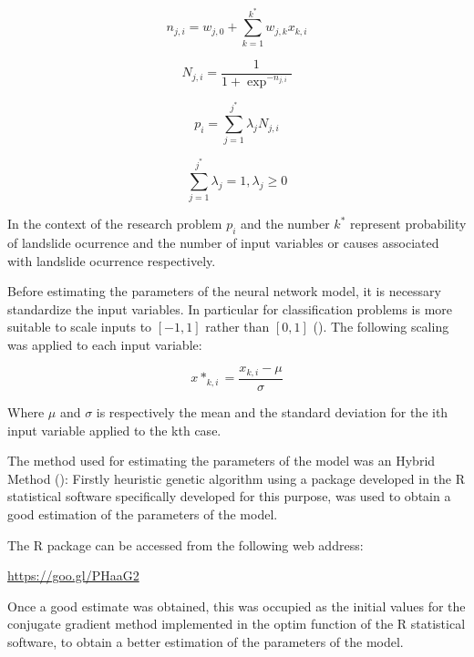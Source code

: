 \documentclass[11pt,twoside]{rmta2010esp}%
\begin{document}
\begin{equation}
n_{j,i} = w_{j,0} + \sum_{k=1}^{k^{*}} w_{j,k}x_{k,i}
\end{equation}

\begin{equation}
N_{j,i} = \frac{1}{1+\exp^{-n_{j,i}}}
\end{equation}



\begin{equation}
p_{i} = \sum_{j=1}^{j^{*}} \lambda_{j} N_{j,i}
\end{equation}

\begin{equation}
\sum_{j=1}^{j^{*}} \lambda_{j} = 1 , \lambda_{j} \ge 0
\end{equation}



In the context of the research problem $p_{i} $ and the number $ k^{*} $ represent 
probability of landslide ocurrence and the number of input variables or causes associated with landslide ocurrence respectively.

Before estimating the parameters of the neural network model, it is necessary standardize the input variables. In particular for classification problems is more suitable to scale inputs to $[-1,1]$ rather than $[0,1]$ (\cite{FAQANN}). The following scaling was applied to each input variable: 

\begin{equation}
x*_{k,i} = \frac{x_{k,i} - \mu }{\sigma}
\end{equation}

Where $ \mu $ and $\sigma$  is respectively the mean and the standard deviation for the ith input variable applied to the kth case.  

The method used for estimating the parameters of the model was an Hybrid Method (\cite{McNelis2005}): Firstly heuristic genetic algorithm using a package developed in the R statistical software specifically developed for this purpose, was used to obtain 
a good estimation of the parameters of the model. 

The R package can be accessed from the following web address:
 
\url{https://goo.gl/PHaaG2}


Once a good estimate was obtained, this was occupied as the initial values for the conjugate gradient method implemented in the optim function of the R statistical software, to obtain a better estimation of the parameters of the model.  
\end{document}
